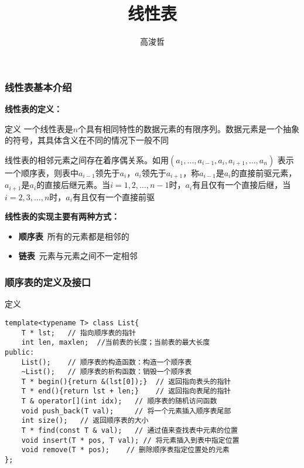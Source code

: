 \documentclass{beamer}
\author{高浚哲}
\institute{西安邮电大学}
\title{线性表}
\begin{document}
	
	\frame{\titlepage}
	
	\begin{frame}[c]\frametitle{线性表基本介绍}
		\textbf{线性表的定义：}
		\begin{block}{定义}
			一个线性表是$n$个具有相同特性的数据元素的有限序列。数据元素是一个抽象的符号，其具体含义在不同的情况下一般不同 \par
			线性表的相邻元素之间存在着序偶关系。如用$(a_1,\dots, a_{i - 1}, a_i, a_{i + 1},\dots,a_n)$ 表示一个顺序表，则表中$a_{i - 1}$领先于$a_i$，$a_i$领先于$a_{i+1}$，称$a_{i-1}$是$a_i$的直接前驱元素，$a_{i+1}$是$a_i$的直接后继元素。当$i=1,2,\dots,n-1$时，$a_i$有且仅有一个直接后继，当$i=2,3,\dots,n$时，$a_i$有且仅有一个直接前驱
		\end{block}
		\textbf{线性表的实现主要有两种方式：}
		\begin{itemize}
			\item \textbf{顺序表}\ 所有的元素都是相邻的
			\item \textbf{链表}\ 元素与元素之间不一定相邻
		\end{itemize}
	\end{frame}
	
	\begin{frame}[fragile]\frametitle{顺序表的定义及接口}
		\begin{block}{定义}
\begin{verbatim}
template<typename T> class List{
    T * lst;   // 指向顺序表的指针
    int len, maxlen;  //当前表的长度；当前表的最大长度
public:
    List();    // 顺序表的构造函数：构造一个顺序表
    ~List();   // 顺序表的析构函数：销毁一个顺序表
    T * begin(){return &(lst[0]);}  // 返回指向表头的指针
    T * end(){return lst + len;}    // 返回指向表尾的指针
    T & operator[](int idx);   // 顺序表的随机访问函数
    void push_back(T val);     // 将一个元素插入顺序表尾部
    int size();   // 返回顺序表的大小
    T * find(const T & val);   // 通过值来查找表中元素的位置
    void insert(T * pos, T val); // 将元素插入到表中指定位置
    void remove(T * pos);    // 删除顺序表指定位置处的元素
};
\end{verbatim}
		\end{block}
	\end{frame}
\end{document}
